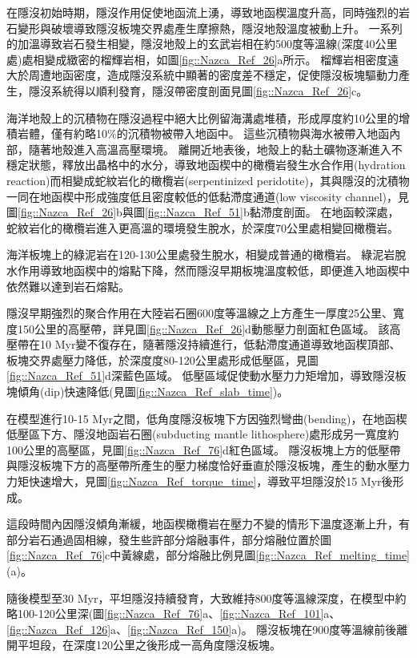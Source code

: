 在隱沒初始時期，隱沒作用促使地函流上湧，導致地函楔溫度升高，同時強烈的岩石變形與破壞導致隱沒板塊交界處產生摩擦熱，隱沒地殼溫度被動上升。
一系列的加溫導致岩石發生相變，隱沒地殼上的玄武岩相在約500度等溫線(深度40公里處)處相變成緻密的榴輝岩相，如圖\ref{fig::Nazca_Ref_26}a所示。
榴輝岩相密度遠大於周遭地函密度，造成隱沒系統中顯著的密度差不穩定，促使隱沒板塊驅動力產生，隱沒系統得以順利發育，隱沒帶密度剖面見圖\ref{fig::Nazca_Ref_26}c。

海洋地殼上的沉積物在隱沒過程中絕大比例留海溝處堆積，形成厚度約10公里的增積岩體，僅有約略10$\%$的沉積物被帶入地函中。
這些沉積物與海水被帶入地函內部，隨著地殼進入高溫高壓環境。
離開近地表後，地殼上的黏土礦物逐漸進入不穩定狀態，釋放出晶格中的水分，導致地函楔中的橄欖岩發生水合作用(hydration reaction)而相變成蛇紋岩化的橄欖岩(serpentinized peridotite)，其與隱沒的沈積物一同在地函楔中形成強度低且密度較低的低黏滯度通道(low viscosity channel)，見圖\ref{fig::Nazca_Ref_26}b與圖\ref{fig::Nazca_Ref_51}b黏滯度剖面。
在地函較深處，蛇紋岩化的橄欖岩進入更高溫的環境發生脫水，於深度70公里處相變回橄欖岩。

海洋板塊上的綠泥岩在120-130公里處發生脫水，相變成普通的橄欖岩。
綠泥岩脫水作用導致地函楔中的熔點下降，然而隱沒早期板塊溫度較低，即便進入地函楔中依然難以達到岩石熔點。

隱沒早期強烈的聚合作用在大陸岩石圈600度等溫線之上方產生一厚度25公里、寬度150公里的高壓帶，詳見圖\ref{fig::Nazca_Ref_26}d動態壓力剖面紅色區域。
該高壓帶在10 Myr變不復存在，隨著隱沒持續進行，低黏滯度通道導致地函楔頂部、板塊交界處壓力降低，於深度度80-120公里處形成低壓區，見圖\ref{fig::Nazca_Ref_51}d深藍色區域。 
低壓區域促使動水壓力力矩增加，導致隱沒板塊傾角(dip)快速降低(見圖\ref{fig::Nazca_Ref_slab_time})。

在模型進行10-15 Myr之間，低角度隱沒板塊下方因強烈彎曲(bending)，在地函楔低壓區下方、隱沒地函岩石圈(subducting mantle lithosphere)處形成另一寬度約100公里的高壓區，見圖\ref{fig::Nazca_Ref_76}d紅色區域。
隱沒板塊上方的低壓帶與隱沒板塊下方的高壓帶所產生的壓力梯度恰好垂直於隱沒板塊，產生的動水壓力力矩快速增大，見圖\ref{fig::Nazca_Ref_torque_time}，導致平坦隱沒於15 Myr後形成。

這段時間內因隱沒傾角漸緩，地函楔橄欖岩在壓力不變的情形下溫度逐漸上升，有部分岩石通過固相線，發生些許部分熔融事件，部分熔融位置於圖\ref{fig::Nazca_Ref_76}c中黃線處，部分熔融比例見圖\ref{fig::Nazca_Ref_melting_time}(a)。

隨後模型至30 Myr，平坦隱沒持續發育，大致維持800度等溫線深度，在模型中約略100-120公里深(圖\ref{fig::Nazca_Ref_76}a、\ref{fig::Nazca_Ref_101}a、\ref{fig::Nazca_Ref_126}a、\ref{fig::Nazca_Ref_150}a)。
隱沒板塊在900度等溫線前後離開平坦段，在深度120公里之後形成一高角度隱沒板塊。

